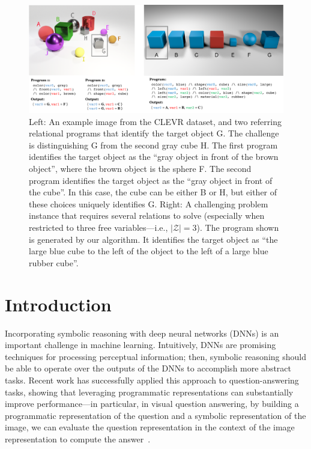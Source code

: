 \begin{figure}[t]
\centering
\includegraphics[width=\textwidth]{example.pdf}
\vspace{-20pt}
\caption{Left: An example image from the CLEVR dataset, and two referring relational programs that identify the target object G. The challenge is distinguishing G from the second gray cube H. The first program identifies the target object as the ``gray object in front of the brown object'', where the brown object is the sphere F. The second program identifies the target object as the ``gray object in front of the cube''. In this case, the cube can be either B or H, but either of these choices uniquely identifies G. Right: A challenging problem instance that requires several relations to solve (especially when restricted to three free variables---i.e., $|\mathcal{Z}|=3$). The program shown is generated by our algorithm. It identifies the target object as ``the large blue cube to the left of the object to the left of a large blue rubber cube''.}
\label{fig:example}
\end{figure}

\section{Introduction}

Incorporating symbolic reasoning with deep neural networks (DNNs) is an important challenge in machine learning. Intuitively, DNNs are promising techniques for processing perceptual information; then, symbolic reasoning should be able to operate over the outputs of the DNNs to accomplish more abstract tasks. Recent work has successfully applied this approach to question-answering tasks, showing that leveraging programmatic representations can substantially improve performance---in particular, in visual question answering, by building a programmatic representation of the question and a symbolic representation of the image, we can evaluate the question representation in the context of the image representation to compute the answer~\cite{yi2018neural,mao2019neuro,ma2019towards}.

